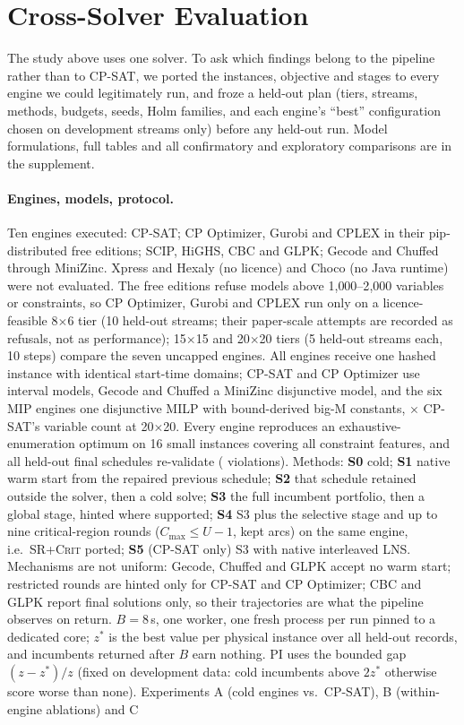 \documentclass[letterpaper]{article} %
\newcommand{\crit}{\textsc{SR+Crit}}
\begin{document}
\section{Cross-Solver Evaluation}
\label{sec:crosssolver}

The study above uses one solver. To ask which findings belong to the pipeline rather than to CP-SAT, we ported the instances, objective and stages to every engine we could legitimately run, and froze a held-out plan (tiers, streams, methods, budgets, seeds, Holm families, and each engine's ``best'' configuration chosen on development streams only) before any held-out run. Model formulations, full tables and all \MSNConfirmatory{} confirmatory and \MSNExploratory{} exploratory comparisons are in the supplement.

\paragraph{Engines, models, protocol.} Ten engines executed: CP-SAT; CP Optimizer, Gurobi and CPLEX in their pip-distributed free editions; SCIP, HiGHS, CBC and GLPK; Gecode and Chuffed through MiniZinc. Xpress and Hexaly (no licence) and Choco (no Java runtime) were not evaluated. The free editions refuse models above 1{,}000--2{,}000 variables or constraints, so CP Optimizer, Gurobi and CPLEX run only on a licence-feasible 8$\times$6 tier (10 held-out streams; their \MSLicenceRefusals{} paper-scale attempts are recorded as refusals, not as performance); 15$\times$15 and 20$\times$20 tiers (5 held-out streams each, 10 steps) compare the seven uncapped engines. All engines receive one hashed instance with identical start-time domains; CP-SAT and CP Optimizer use interval models, Gecode and Chuffed a MiniZinc disjunctive model, and the six MIP engines one disjunctive MILP with bound-derived big-M constants, \MSMilpVsCpsatVarsMTwoZero$\times$ CP-SAT's variable count at 20$\times$20. Every engine reproduces an exhaustive-enumeration optimum on 16 small instances covering all constraint features, and all \MSValidated{} held-out final schedules re-validate (\MSViolations{} violations). Methods: \textbf{S0} cold; \textbf{S1} native warm start from the repaired previous schedule; \textbf{S2} that schedule retained outside the solver, then a cold solve; \textbf{S3} the full incumbent portfolio, then a global stage, hinted where supported; \textbf{S4} S3 plus the selective stage and up to nine critical-region rounds ($C_{\max}\le U{-}1$, kept arcs) on the same engine, i.e.\ \crit{} ported; \textbf{S5} (CP-SAT only) S3 with native interleaved LNS. Mechanisms are not uniform: Gecode, Chuffed and GLPK accept no warm start; restricted rounds are hinted only for CP-SAT and CP Optimizer; CBC and GLPK report final solutions only, so their trajectories are what the pipeline observes on return. $B=8$\,s, one worker, one fresh process per run pinned to a dedicated core; $z^*$ is the best value per physical instance over all held-out records, and incumbents returned after $B$ earn nothing. PI uses the bounded gap $(z-z^*)/z$ \citep{berthold2013} (fixed on development data: cold incumbents above $2z^*$ otherwise score worse than none). Experiments A (cold engines vs.\ CP-SAT), B (within-engine ablations) and C 
\end{document}

